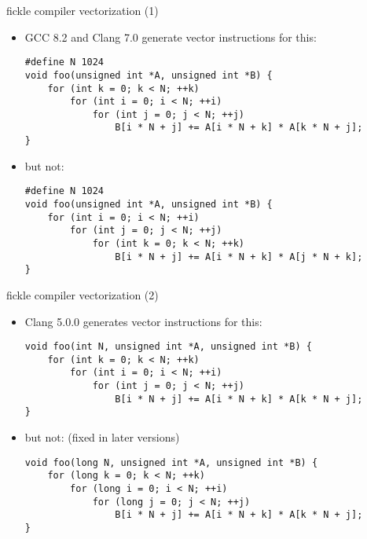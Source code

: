 \begin{frame}[fragile,label=vectFickle1]{fickle compiler vectorization (1)}
    \lstset{language=C,style=smaller}
    \begin{itemize}
    \item GCC 8.2 and Clang 7.0 generate vector instructions for this:
\begin{lstlisting}
#define N 1024
void foo(unsigned int *A, unsigned int *B) {
    for (int k = 0; k < N; ++k)
        for (int i = 0; i < N; ++i)
            for (int j = 0; j < N; ++j)
                B[i * N + j] += A[i * N + k] * A[k * N + j];
}
\end{lstlisting}
\item but not:
\begin{lstlisting}
#define N 1024
void foo(unsigned int *A, unsigned int *B) {
    for (int i = 0; i < N; ++i)
        for (int j = 0; j < N; ++j)
            for (int k = 0; k < N; ++k)
                B[i * N + j] += A[i * N + k] * A[j * N + k];
}
\end{lstlisting}
    \end{itemize}
\end{frame}

\begin{frame}[fragile,label=vectFickle2]{fickle compiler vectorization (2)}
    \lstset{language=C,style=smaller}
    \begin{itemize}
    \item Clang 5.0.0 generates vector instructions for this:
\begin{lstlisting}
void foo(int N, unsigned int *A, unsigned int *B) {
    for (int k = 0; k < N; ++k)
        for (int i = 0; i < N; ++i)
            for (int j = 0; j < N; ++j)
                B[i * N + j] += A[i * N + k] * A[k * N + j];
}
\end{lstlisting}
\item but not: (fixed in later versions)
\begin{lstlisting}
void foo(long N, unsigned int *A, unsigned int *B) {
    for (long k = 0; k < N; ++k)
        for (long i = 0; i < N; ++i)
            for (long j = 0; j < N; ++j)
                B[i * N + j] += A[i * N + k] * A[k * N + j];
}
\end{lstlisting}
    \end{itemize}
\end{frame}
